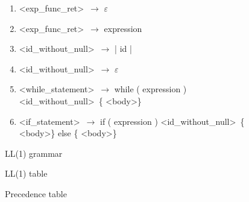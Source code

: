 \documentclass[a4paper, 11pt]{article}
\begin{document}
\begin{figure}[ht]
\begin{center}
\begin{enumerate}
        \item \textless exp\_func\_ret\textgreater\ $\to$ $\varepsilon$
        \item \textless exp\_func\_ret\textgreater\ $\to$ expression
        \item \textless id\_without\_null\textgreater\ $\to$ | id |
        \item \textless id\_without\_null\textgreater\ $\to$ $\varepsilon$
        \item \textless while\_statement\textgreater\ $\to$ while ( expression ) \textless id\_without\_null\textgreater\ \{ \textless body\textgreater \}
        \item \textless if\_statement\textgreater\ $\to$ if ( expression ) \textless id\_without\_null\textgreater\ \{ \textless body\textgreater \} else \{ \textless body\textgreater \}
    \end{enumerate}
    \caption{LL(1) grammar}
    \label{ll1rules}
\end{center}
\end{figure}

\begin{figure}[ht]
    \begin{center}
        \caption{LL(1) table}
        \label{ll1table}
    \end{center}
\end{figure}

\begin{figure}[ht]
    \begin{center}
        \caption{Precedence table}
        \label{prectable}
    \end{center}
\end{figure}
\end{document}
